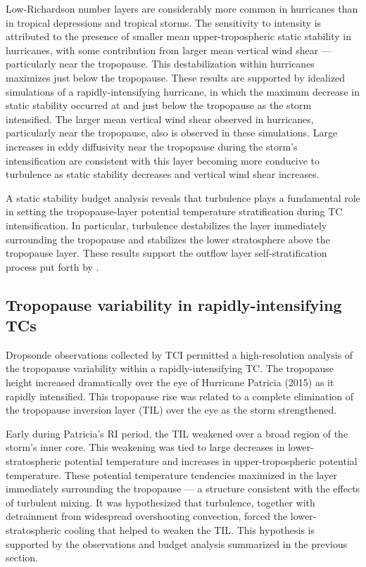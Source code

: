 Low-Richardson number layers are considerably more common in hurricanes than in tropical depressions and tropical storms.
The sensitivity to intensity is attributed to the presence of smaller mean upper-tropospheric static stability in hurricanes, with some contribution from larger mean vertical wind shear --- particularly near the tropopause.
This destabilization within hurricanes maximizes just below the tropopause.
These results are supported by idealized simulations of a rapidly-intensifying hurricane, in which the maximum decrease in static stability occurred at and just below the tropopause as the storm intensified.
The larger mean vertical wind shear observed in hurricanes, particularly near the tropopause, also is observed in these simulations.
Large increases in eddy diffusivity near the tropopause during the storm's intensification are consistent with this layer becoming more conducive to turbulence as static stability decreases and vertical wind shear increases.

A static stability budget analysis reveals that turbulence plays a fundamental role in setting the tropopause-layer potential temperature stratification during TC intensification.
In particular, turbulence destabilizes the layer immediately surrounding the tropopause and stabilizes the lower stratosphere above the tropopause layer.
These results support the outflow layer self-stratification process put forth by \cite{EmanuelRotunno2011}.

\subsection{Tropopause variability in rapidly-intensifying TCs}

Dropsonde observations collected by TCI permitted a high-resolution analysis of the tropopause variability within a rapidly-intensifying TC.
The tropopause height increased dramatically over the eye of Hurricane Patricia (2015) as it rapidly intensified.
This tropopause rise was related to a complete elimination of the tropopause inversion layer (TIL) over the eye as the storm strengthened.

Early during Patricia's RI period, the TIL weakened over a broad region of the storm's inner core.
This weakening was tied to large decreases in lower-stratospheric potential temperature and increases in upper-tropospheric potential temperature.
These potential temperature tendencies maximized in the layer immediately surrounding the tropopause --- a structure consistent with the effects of turbulent mixing.
It was hypothesized that turbulence, together with detrainment from widespread overshooting convection, forced the lower-stratospheric cooling that helped to weaken the TIL.
This hypothesis is supported by the observations and budget analysis summarized in the previous section.

